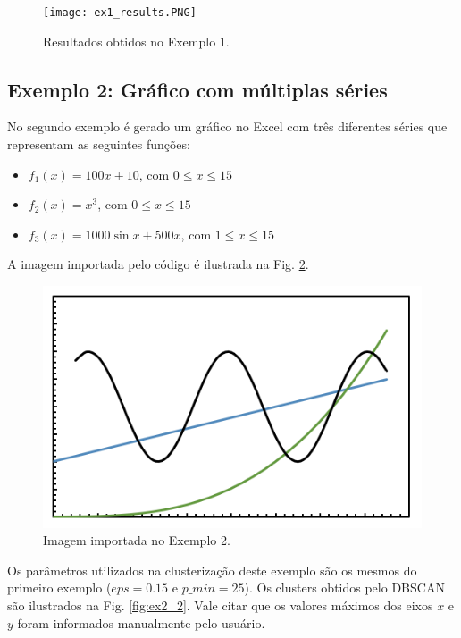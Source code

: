 \documentclass{article}
\begin{document}
    \begin{figure}[H]
        \centering
        \texttt{[image: ex1\_results.PNG]}
        \caption{Resultados obtidos no Exemplo 1.}
        \label{fig:ex1_3}
    \end{figure}
    
    \subsection{Exemplo 2: Gráfico com múltiplas séries}    
    
    No segundo exemplo é gerado um gráfico no Excel com três diferentes séries que representam as seguintes funções:
    
    \begin{itemize}
        \item $f_1(x)=100x+10$, com $0\leq x \leq 15$
        \item $f_2(x)=x^3$, com $0\leq x \leq 15$
        \item $f_3(x)=1000\sin{x}+500x$, com $1\leq x \leq 15$
    \end{itemize}
    
    A imagem importada pelo código é ilustrada na Fig. \ref{fig:ex2_1}.
    
    \begin{figure}[h]
        \centering
        \includegraphics[scale=0.5]{t4.PNG}
        \caption{Imagem importada no Exemplo 2.}
        \label{fig:ex2_1}
    \end{figure}
    
    Os parâmetros utilizados na clusterização deste exemplo são os mesmos do primeiro exemplo ($eps=0.15$ e $p\_min=25$). Os clusters obtidos pelo DBSCAN são ilustrados na Fig. \ref{fig:ex2_2}. Vale citar que os valores máximos dos eixos $x$ e $y$ foram informados manualmente pelo usuário.
    
\end{document}
